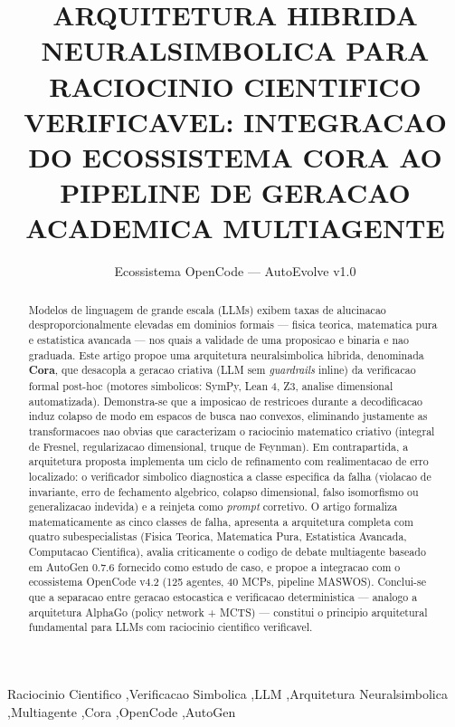 \documentclass[5p]{elsarticle}
\theoremstyle{remark}
\begin{document}
\begin{frontmatter}
\title{ARQUITETURA HIBRIDA NEURALSIMBOLICA PARA RACIOCINIO CIENTIFICO VERIFICAVEL: INTEGRACAO DO ECOSSISTEMA CORA AO PIPELINE DE GERACAO ACADEMICA MULTIAGENTE}
\author[ufc]{Ecossistema OpenCode --- AutoEvolve v1.0}
\address[ufc]{PPGTE/CT/UFC --- Universidade Federal do Ceara, Fortaleza, CE, Brasil}

\begin{abstract}
Modelos de linguagem de grande escala (LLMs) exibem taxas de alucinacao desproporcionalmente elevadas em dominios formais --- fisica teorica, matematica pura e estatistica avancada --- nos quais a validade de uma proposicao e binaria e nao graduada. Este artigo propoe uma arquitetura neuralsimbolica hibrida, denominada \textbf{Cora}, que desacopla a geracao criativa (LLM sem \textit{guardrails} inline) da verificacao formal post-hoc (motores simbolicos: SymPy, Lean 4, Z3, analise dimensional automatizada). Demonstra-se que a imposicao de restricoes durante a decodificacao induz colapso de modo em espacos de busca nao convexos, eliminando justamente as transformacoes nao obvias que caracterizam o raciocinio matematico criativo (integral de Fresnel, regularizacao dimensional, truque de Feynman). Em contrapartida, a arquitetura proposta implementa um ciclo de refinamento com realimentacao de erro localizado: o verificador simbolico diagnostica a classe especifica da falha (violacao de invariante, erro de fechamento algebrico, colapso dimensional, falso isomorfismo ou generalizacao indevida) e a reinjeta como \textit{prompt} corretivo. O artigo formaliza matematicamente as cinco classes de falha, apresenta a arquitetura completa com quatro subespecialistas (Fisica Teorica, Matematica Pura, Estatistica Avancada, Computacao Cientifica), avalia criticamente o codigo de debate multiagente baseado em AutoGen 0.7.6 fornecido como estudo de caso, e propoe a integracao com o ecossistema OpenCode v4.2 (125 agentes, 40 MCPs, pipeline MASWOS). Conclui-se que a separacao entre geracao estocastica e verificacao deterministica --- analogo a arquitetura AlphaGo (policy network + MCTS) --- constitui o principio arquitetural fundamental para LLMs com raciocinio cientifico verificavel.
\end{abstract}
\begin{keyword}
Raciocinio Cientifico \sep Verificacao Simbolica \sep LLM \sep Arquitetura Neuralsimbolica \sep Multiagente \sep Cora \sep OpenCode \sep AutoGen
\end{keyword}
\end{frontmatter}
\maketitle
\end{document}
